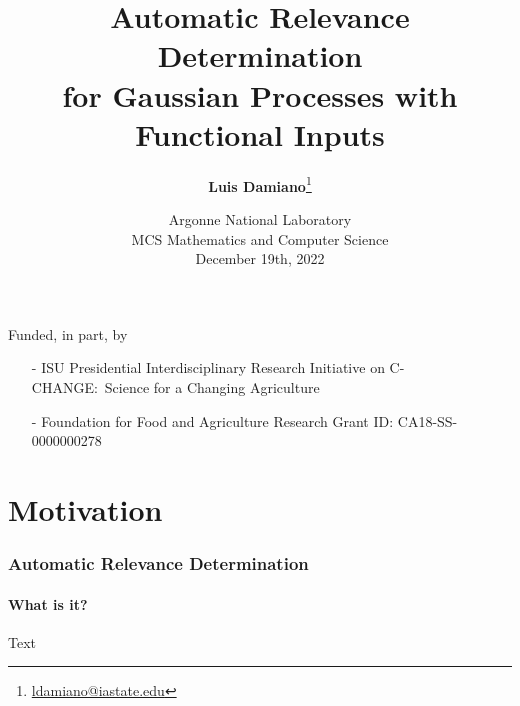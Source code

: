 \documentclass{snedecorbeamer}
\title{\textbf{Automatic Relevance Determination} \\
  for Gaussian Processes with Functional Inputs}
\author[Damiano et al]{
  \textbf{Luis Damiano}\footnote[2]{
    \tiny{\href{mailto:ldamiano@iastate.edu}{ldamiano@iastate.edu}}
  }}
\institute{
  Department of Statistics, Iowa State University
}
\date[December 19th, 2022]{
  \tiny{Argonne National Laboratory \\
    MCS Mathematics and Computer Science} \\
  December 19th, 2022}
\begin{document}
\begin{frame}
  \titlepage{}
  {
    \tiny{
      Funded, in part, by
      \begin{itemize}
      \item[-] ISU Presidential Interdisciplinary
	Research Initiative on C-CHANGE:~Science for a Changing
	Agriculture
      \item[-] Foundation for Food and Agriculture Research
	Grant ID: CA18-SS-0000000278
      \end{itemize}
    }
  }
\end{frame}

%
\section{Motivation}

\begin{frame}
  \frametitle{Automatic Relevance Determination}
  \framesubtitle{What is it?}

  Text
\end{frame}
\end{document}
